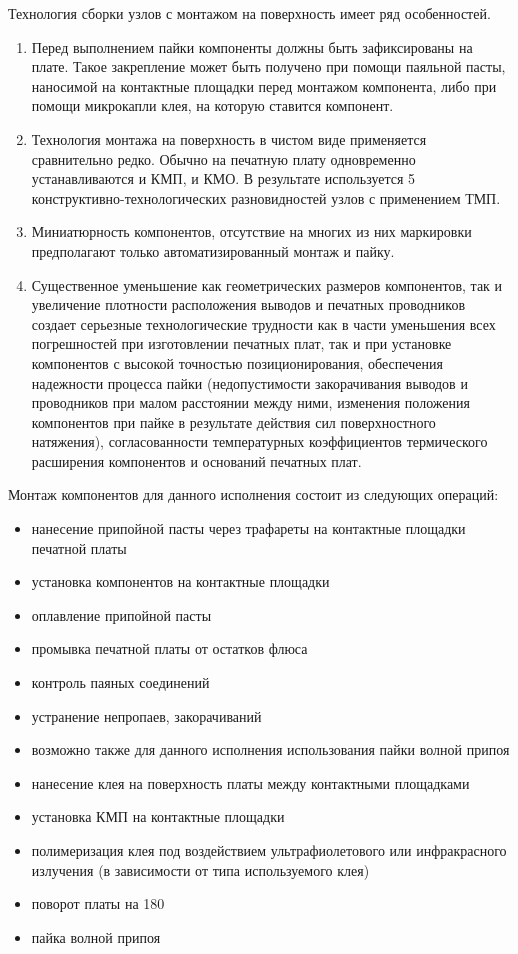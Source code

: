 \documentclass[unicode, 12pt, a4paper, oneside]{article}
\begin{document}
Технология сборки узлов с монтажом на поверхность имеет ряд особенностей.
\begin{enumerate}
\item Перед выполнением пайки компоненты должны быть зафиксированы на плате. Такое закрепление может быть получено при помощи паяльной пасты, наносимой на контактные площадки перед монтажом компонента, либо при помощи микрокапли клея, на которую ставится компонент.
\item Технология монтажа на поверхность в чистом виде применяется сравнительно редко. Обычно на печатную плату одновременно устанавливаются и КМП, и КМО. В результате используется 5 конструктивно-технологических разновидностей узлов с применением ТМП.
\item Миниатюрность компонентов, отсутствие на многих из них маркировки предполагают только автоматизированный монтаж и пайку.
\item Существенное уменьшение как геометрических размеров компонентов, так и увеличение плотности расположения выводов и печатных проводников создает серьезные технологические трудности как в части уменьшения всех погрешностей при изготовлении печатных плат, так и при установке компонентов с высокой точностью позиционирования, обеспечения надежности процесса пайки (недопустимости закорачивания выводов и проводников при малом расстоянии между ними, изменения положения компонентов при пайке в результате действия сил поверхностного натяжения), согласованности температурных коэффициентов термического расширения  компонентов и оснований печатных плат.
\end{enumerate}

Монтаж компонентов для данного исполнения состоит из следующих операций:
\begin{itemize}
\item нанесение припойной пасты через трафареты на контактные площадки печатной платы
\item установка компонентов на контактные площадки
\item оплавление припойной пасты
\item промывка печатной платы от остатков флюса
\item контроль паяных соединений
\item устранение непропаев,  закорачиваний
\item возможно также для данного исполнения использования пайки волной припоя
\item нанесение клея на поверхность платы между контактными площадками
\item установка КМП на контактные площадки
\item полимеризация клея под воздействием ультрафиолетового или инфракрасного излучения (в зависимости от типа используемого клея)
\item поворот платы на 180 \textcelsius
\item пайка волной припоя
\end{itemize}
\end{document}
